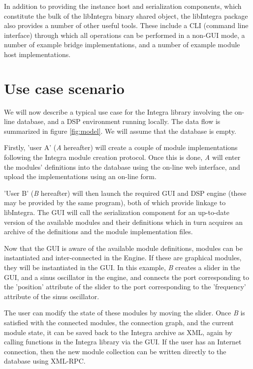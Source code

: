 \documentclass{article}
\begin{document}
In addition to providing the instance host and serialization components, which constitute the bulk of the libIntegra binary shared object, the libIntegra package also provides a number of other useful tools. These include a CLI (command line interface) through which all operations can be performed in a non-GUI mode, a number of example bridge implementations, and a number of example module host implementations.

\section{Use case scenario}\label{sec:use_case}

We will now describe a typical use case for the Integra library involving the on-line database, and a DSP environment running locally. The data flow is summarized in figure \ref{fig:model}. We will assume that the database is empty.

Firstly, 'user A' (\emph{A} hereafter) will create a couple of module implementations following the Integra module creation protocol. Once this is done, \emph{A} will enter the modules' definitions into the database using the on-line web interface, and upload the implementations using an on-line form. 

'User B' (\emph{B} hereafter) will then launch the required GUI and DSP engine (these may be provided by the same program), both of which provide linkage to libIntegra. The GUI will call the serialization component for an up-to-date version of the available modules and their definitions which in turn acquires an archive of the definitions and the module implementation files.

Now that the GUI is aware of the available module definitions, modules can be instantiated and inter-connected in the Engine. If these are graphical modules, they will be instantiated in the GUI. In this example, \emph{B} creates a slider in the GUI, and a sinus oscillator in the engine, and connects the port corresponding to the 'position' attribute of the slider to the port corresponding to the 'frequency' attribute of the sinus oscillator.

The user can modify the state of these modules by moving the slider. Once \emph{B} is satisfied with the connected modules, the connection graph, and the current module state, it can be saved back to the Integra archive as XML, again by calling functions in the Integra library via the GUI. If the user has an Internet connection, then the new module collection can be written directly to the database using XML-RPC.
\end{document}
